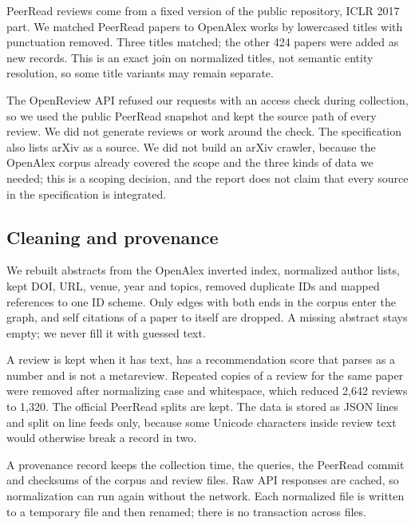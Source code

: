 \documentclass[11pt,a4paper]{article}
\begin{document}
PeerRead reviews come from a fixed version of the public repository, ICLR 2017 part. We matched PeerRead papers to OpenAlex works by lowercased titles with punctuation removed. Three titles matched; the other 424 papers were added as new records. This is an exact join on normalized titles, not semantic entity resolution, so some title variants may remain separate.

The OpenReview API refused our requests with an access check during collection, so we used the public PeerRead snapshot and kept the source path of every review. We did not generate reviews or work around the check. The specification also lists arXiv as a source. We did not build an arXiv crawler, because the OpenAlex corpus already covered the scope and the three kinds of data we needed; this is a scoping decision, and the report does not claim that every source in the specification is integrated.

\subsection{Cleaning and provenance}
We rebuilt abstracts from the OpenAlex inverted index, normalized author lists, kept DOI, URL, venue, year and topics, removed duplicate IDs and mapped references to one ID scheme. Only edges with both ends in the corpus enter the graph, and self citations of a paper to itself are dropped. A missing abstract stays empty; we never fill it with guessed text.

A review is kept when it has text, has a recommendation score that parses as a number and is not a metareview. Repeated copies of a review for the same paper were removed after normalizing case and whitespace, which reduced 2,642 reviews to 1,320. The official PeerRead splits are kept. The data is stored as JSON lines and split on line feeds only, because some Unicode characters inside review text would otherwise break a record in two.

A provenance record keeps the collection time, the queries, the PeerRead commit and checksums of the corpus and review files. Raw API responses are cached, so normalization can run again without the network. Each normalized file is written to a temporary file and then renamed; there is no transaction across files.
\end{document}
